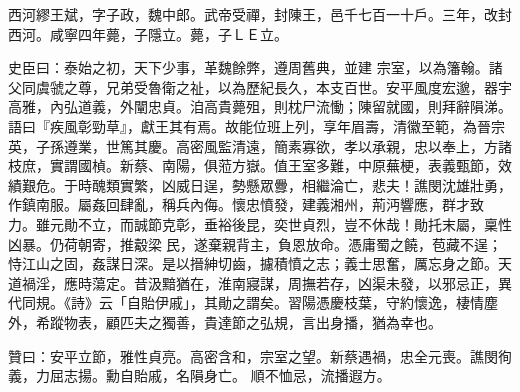\begin{pinyinscope}
 西河繆王斌，字子政，魏中郎。武帝受禪，封陳王，邑千七百一十戶。三年，改封西河。咸寧四年薨，子隱立。薨，子ＬＥ立。



 史臣曰：泰始之初，天下少事，革魏餘弊，遵周舊典，並建
 宗室，以為籓翰。諸父同虞虢之尊，兄弟受魯衛之祉，以為歷紀長久，本支百世。安平風度宏邈，器宇高雅，內弘道義，外闡忠貞。洎高貴薨殂，則枕尸流慟；陳留就國，則拜辭隕涕。語曰『疾風彰勁草』，獻王其有焉。故能位班上列，享年眉壽，清徽至範，為晉宗英，子孫遵業，世篤其慶。高密風監清遠，簡素寡欲，孝以承親，忠以奉上，方諸枝庶，實謂國楨。新蔡、南陽，俱蒞方嶽。值王室多難，中原蕪梗，表義甄節，效績艱危。于時醜類實繁，凶威日逞，勢懸眾釁，相繼淪亡，悲夫！譙閔沈雄壯勇，作鎮南服。屬姦回肆亂，稱兵內侮。懷忠憤發，建義湘州，荊沔響應，群才致
 力。雖元勛不立，而誠節克彰，垂裕後昆，奕世貞烈，豈不休哉！勛托末屬，稟性凶暴。仍荷朝寄，推觳梁民，遂棄親背主，負恩放命。憑庸蜀之饒，苞藏不逞；恃江山之固，姦謀日深。是以搢紳切齒，攄積憤之志；義士思奮，厲忘身之節。天道禍淫，應時蕩定。昔汲黯猶在，淮南寢謀，周撫若存，凶渠未發，以邪忌正，異代同規。《詩》云「自貽伊戚」，其勛之謂矣。習陽憑慶枝葉，守約懷逸，棲情塵外，希蹤物表，顧匹夫之獨善，貴達節之弘規，言出身播，猶為幸也。



 贊曰：安平立節，雅性貞亮。高密含和，宗室之望。新蔡遇禍，忠全元喪。譙閔徇義，力屈志揚。勳自貽戚，名隕身亡。
 順不恤忌，流播遐方。



\end{pinyinscope}